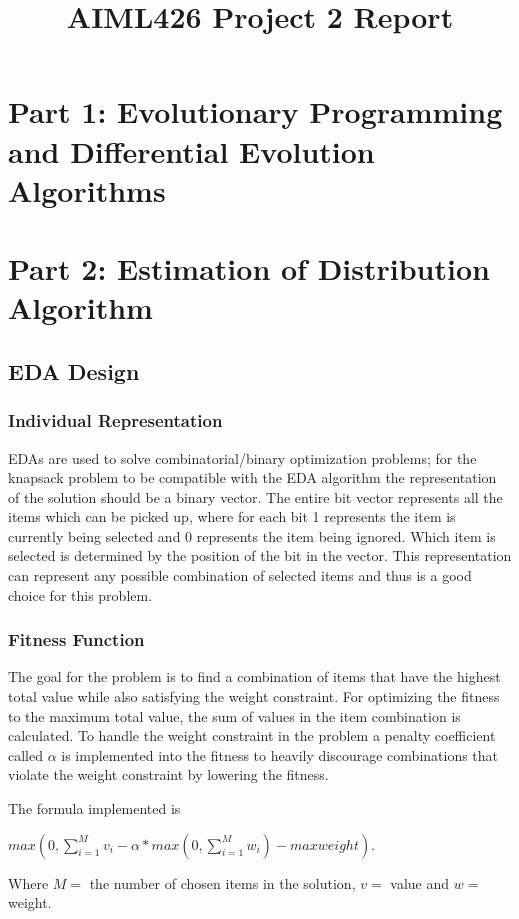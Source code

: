 \documentclass{article}
\title{AIML426 Project 2 Report}
\date{}
\begin{document}
	\maketitle
	
\section*{Part 1: Evolutionary Programming and Differential Evolution Algorithms}
\section*{Part 2: Estimation of Distribution Algorithm}
\subsection*{EDA Design}
\subsubsection*{Individual Representation}
EDAs are used to solve combinatorial/binary optimization problems; for the knapsack problem to be compatible with the EDA algorithm the representation of the solution should be a binary vector. The entire bit vector represents all the items which can be picked up, where for each bit 1 represents the item is currently being selected and 0 represents the item being ignored. Which item is selected is determined by the position of the bit in the vector. This representation can represent any possible combination of selected items and thus is a good choice for this problem. \par
\subsubsection*{Fitness Function}
The goal for the problem is to find a combination of items that have the highest total value while also satisfying the weight constraint. For optimizing the fitness to the maximum total value, the sum of values in the item combination is calculated. To handle the weight constraint in the problem a penalty coefficient called $\alpha$ is implemented into the fitness to heavily discourage combinations that violate the weight constraint by lowering the fitness. \par 
\noindent The formula implemented is 
\begin{center}
$max(0, \sum_{i=1}^{M}v_i - \alpha *max(0,\sum_{i=1}^{M}w_i)-max weight)$. 
\end{center}
Where $M=$ the number of chosen items in the solution, $v=$ value and $w=$ weight.
\end{document}
